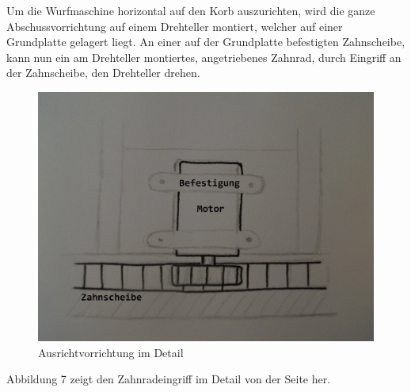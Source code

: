 Um die Wurfmaschine horizontal auf den Korb auszurichten, wird die ganze Abschussvorrichtung auf einem Drehteller montiert, welcher auf einer Grundplatte gelagert liegt. An einer auf der Grundplatte befestigten Zahnscheibe, kann nun ein am Drehteller montiertes, angetriebenes Zahnrad, durch Eingriff an der Zahnscheibe, den Drehteller drehen.
\begin{figure}[h!]
	\centering
	\includegraphics[scale=0.35]{../../fig/Ausrichtvorrichtung_Detail.jpg}
	\caption{Ausrichtvorrichtung im Detail}
\end{figure}
Abbildung 7 zeigt den Zahnradeingriff im Detail von der Seite her.
